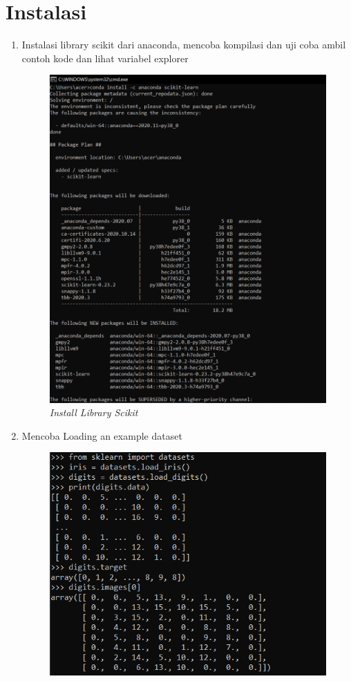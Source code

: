 \section{Instalasi}
\begin{enumerate}
    \item Instalasi library scikit dari anaconda, mencoba kompilasi dan uji coba ambil
contoh kode dan lihat variabel explorer
    \begin{figure}[!htbp]
    \centering
    \includegraphics[scale=0.6]{figures/1.PNG}
    \caption{\textit{Install Library Scikit}}
    \label{Figure}
    \end{figure}
    \newpage
    \item Mencoba Loading an example dataset
    \begin{figure}[!htbp]
    \centering
    \includegraphics[scale=1]{figures/Loadingdatasets/1.PNG}

\end{figure}
\end{enumerate}
